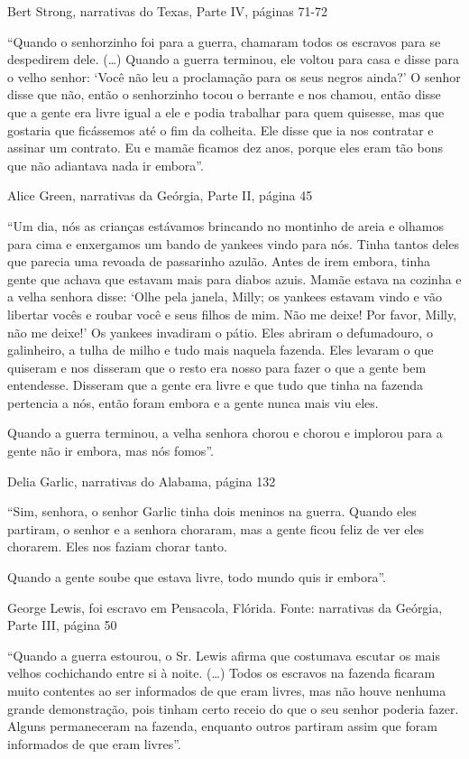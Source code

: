 Bert Strong, narrativas do Texas, Parte IV, páginas 71-72

``Quando o senhorzinho foi para a guerra, chamaram todos os escravos
para se despedirem dele. (\ldots{}) Quando a guerra terminou, ele voltou
para casa e disse para o velho senhor: `Você não leu a proclamação para
os seus negros ainda?' O senhor disse que não, então o senhorzinho tocou
o berrante e nos chamou, então disse que a gente era livre igual a ele e
podia trabalhar para quem quisesse, mas que gostaria que ficássemos até
o fim da colheita. Ele disse que ia nos contratar e assinar um contrato.
Eu e mamãe ficamos dez anos, porque eles eram tão bons que não adiantava
nada ir embora''.

Alice Green, narrativas da Geórgia, Parte II, página 45

``Um dia, nós as crianças estávamos brincando no montinho de areia e
olhamos para cima e enxergamos um bando de yankees vindo para nós. Tinha
tantos deles que parecia uma revoada de passarinho azulão. Antes de irem
embora, tinha gente que achava que estavam mais para diabos azuis. Mamãe
estava na cozinha e a velha senhora disse: `Olhe pela janela, Milly; os
yankees estavam vindo e vão libertar vocês e roubar você e seus filhos
de mim. Não me deixe! Por favor, Milly, não me deixe!' Os yankees
invadiram o pátio. Eles abriram o defumadouro, o galinheiro, a tulha de
milho e tudo mais naquela fazenda. Eles levaram o que quiseram e nos
disseram que o resto era nosso para fazer o que a gente bem entendesse.
Disseram que a gente era livre e que tudo que tinha na fazenda pertencia
a nós, então foram embora e a gente nunca mais viu eles.

Quando a guerra terminou, a velha senhora chorou e chorou e implorou
para a gente não ir embora, mas nós fomos''.

Delia Garlic, narrativas do Alabama, página 132

``Sim, senhora, o senhor Garlic tinha dois meninos na guerra. Quando
eles partiram, o senhor e a senhora choraram, mas a gente ficou feliz de
ver eles chorarem. Eles nos faziam chorar tanto.

Quando a gente soube que estava livre, todo mundo quis ir embora''.

George Lewis, foi escravo em Pensacola, Flórida. Fonte: narrativas da
Geórgia, Parte III, página 50

``Quando a guerra estourou, o Sr. Lewis afirma que costumava escutar os
mais velhos cochichando entre si à noite. (\ldots{}) Todos os escravos
na fazenda ficaram muito contentes ao ser informados de que eram livres,
mas não houve nenhuma grande demonstração, pois tinham certo receio do
que o seu senhor poderia fazer. Alguns permaneceram na fazenda, enquanto
outros partiram assim que foram informados de que eram livres''.

